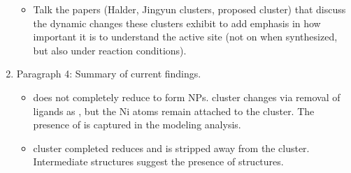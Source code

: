 \documentclass[journal=jctcce,manuscript=article]{achemso}
\begin{document}
\begin{enumerate}
\begin{itemize}
        \item Talk the papers (Halder, Jingyun  clusters,  proposed cluster) that discuss the dynamic changes these clusters exhibit to add emphasis in how important it is to understand the active site (not on when synthesized, but also under reaction conditions). 
    \end{itemize}
    \item Paragraph 4: Summary of current findings. 
    \begin{itemize}
        \item {} does not completely reduce to form NPs.  cluster changes via removal of  ligands as , but the Ni atoms remain attached to the cluster. The presence of  is captured in the modeling analysis. 
        \item {} cluster completed reduces and is stripped away from the cluster. Intermediate structures suggest the presence of  structures. 
    \end{itemize}
\end{enumerate}


\end{document}
